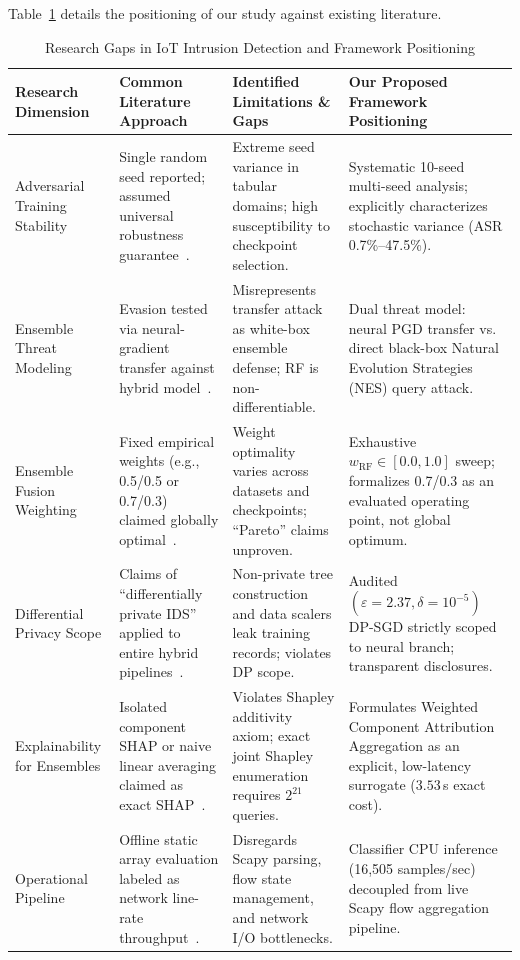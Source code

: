 \documentclass[10pt,journal,compsoc,twocolumn]{IEEEtran}
\begin{document}
Table~\ref{tab:research_gaps} details the positioning of our study against existing literature.

\begin{table}[tbp]
\caption{Research Gaps in IoT Intrusion Detection and Framework Positioning}
\label{tab:research_gaps}
\centering
\begin{tabular}{p{2.8cm}p{4.2cm}p{4.5cm}p{4.8cm}}
\toprule
\textbf{Research Dimension} & \textbf{Common Literature Approach} & \textbf{Identified Limitations \& Gaps} & \textbf{Our Proposed Framework Positioning} \\
\midrule
Adversarial Training Stability & Single random seed reported; assumed universal robustness guarantee~\cite{madry2018towards, ma2025backdoor}. & Extreme seed variance in tabular domains; high susceptibility to checkpoint selection. & Systematic 10-seed multi-seed analysis; explicitly characterizes stochastic variance (ASR 0.7\%--47.5\%). \\
\midrule
Ensemble Threat Modeling & Evasion tested via neural-gradient transfer against hybrid model~\cite{alshahrani2021adversarial}. & Misrepresents transfer attack as white-box ensemble defense; RF is non-differentiable. & Dual threat model: neural PGD transfer vs. direct black-box Natural Evolution Strategies (NES) query attack. \\
\midrule
Ensemble Fusion Weighting & Fixed empirical weights (e.g., 0.5/0.5 or 0.7/0.3) claimed globally optimal~\cite{yousefi2023differentially}. & Weight optimality varies across datasets and checkpoints; ``Pareto'' claims unproven. & Exhaustive $w_{\text{RF}} \in [0.0, 1.0]$ sweep; formalizes 0.7/0.3 as an evaluated operating point, not global optimum. \\
\midrule
Differential Privacy Scope & Claims of ``differentially private IDS'' applied to entire hybrid pipelines~\cite{abadi2016deep}. & Non-private tree construction and data scalers leak training records; violates DP scope. & Audited $(\varepsilon=2.37, \delta=10^{-5})$ DP-SGD strictly scoped to neural branch; transparent disclosures. \\
\midrule
Explainability for Ensembles & Isolated component SHAP or naive linear averaging claimed as exact SHAP~\cite{lundberg2017unified, sharaf2024identifying}. & Violates Shapley additivity axiom; exact joint Shapley enumeration requires $2^{21}$ queries. & Formulates Weighted Component Attribution Aggregation as an explicit, low-latency surrogate ($3.53$\,s exact cost). \\
\midrule
Operational Pipeline & Offline static array evaluation labeled as network line-rate throughput~\cite{harbi2024roadmap}. & Disregards Scapy parsing, flow state management, and network I/O bottlenecks. & Classifier CPU inference (16,505 samples/sec) decoupled from live Scapy flow aggregation pipeline. \\
\bottomrule
\end{tabular}
\end{table}
\end{document}
